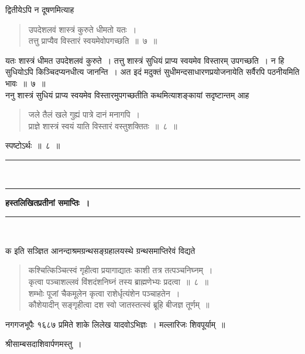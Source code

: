 \documentclass[11pt, openany]{book}
\begin{document}
\vspace{-2mm}
 द्वितीयेऽपि न दूषणमित्याह\textendash
\begin{quote}
    \ab 
 उपदेशलवं शास्त्रं कुरुते धीमतो यतः~।\\
 तत्तु प्राप्यैव विस्तारं स्वयमेवोपगच्छति~॥~७~॥~
\end{quote}

 यतः शास्त्रं धीमत उपदेशलवं कुरुते~। तत्तु शास्त्रं सुधियं प्राप्य स्वयमेव
विस्तारम् उपगच्छति~। न हि सुधियोऽपि किञ्चिदप्यनधीत्य जानन्ति~। अत इदं
मदुक्तं सुधीमन्दसाधारणप्रयोजनायेति सर्वैरपि पठनीयमिति भावः~॥~७~॥~\\

\vspace{-2mm}
 ननु शास्त्रं सुधियं प्राप्य स्वयमेव विस्तारमुपगच्छतीति 
कथमित्याशङ्कायां सदृष्टान्तम् आह\textendash
\begin{quote}
    \ab 
     जले तैलं खले गुह्यं पात्रे दानं मनागपि~।\\
 प्राज्ञे शास्त्रं स्वयं याति विस्तारं वस्तुशक्तितः~॥~८~॥~
\end{quote}

 स्पष्टोऽर्थः~॥~८~॥~\\
\begin{center}
    \rule{0.3\linewidth}{0.5pt}\\
    \vspace{-5mm}
    \rule{0.3\linewidth}{0.5pt}
\end{center}
\newpage
 \label{ch13}
\begin{center}
{\LARGE \textbf{हस्तलिखितप्रतीनां समाप्तिः~।}}\\
    \rule{0.4\linewidth}{0.5pt}\\
\end{center}

क इति सञ्ज्ञित आनन्दाश्रमग्रन्थसङ्ग्रहालयस्थे ग्रन्थसमाप्तिरेवं विद्यते\textendash

 \label{End8}
\begin{quote}
    \qt 
    कश्चित्किञ्चित्स्वं गृहीत्वा प्रयागाद्यातः काशी तत्र तत्पञ्चनिघ्नम्~।\\
कृत्वा पञ्चाशल्लवं विंशदंशनिघ्नं तस्य ब्राह्मणेभ्यः प्रदत्वा~॥~८~॥\\
शम्भोः पूजां चैकमूलेन कृत्वा राशेर्धृत्यंशेन पञ्चाहतेन~।\\
कौशेयादीन् सङ्गृहीत्वा दश स्वो जातस्तत्स्वं ब्रूहि बीजज्ञ तूर्णम्~॥
\end{quote}

नगगजभूपैः १६८७ प्रमिते शाके लिलेख यादवोऽभिज्ञः~।
मल्लारिजः शिवपूर्याम्~॥
\begin{center}
{\qt श्रीसाम्बसदाशिवार्पणमस्तु~।}\\
\end{center}
\vspace{-4mm}
\end{document}
